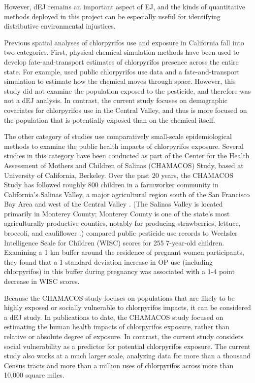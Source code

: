 \documentclass[ijerph,article,submit,oneauthor,pdftex]{Definitions/mdpi}
\begin{document}
However, dEJ remains an important aspect of EJ, and the kinds of quantitative methods deployed in this project can be especially useful for identifying distributive environmental injustices.

Previous spatial analyses of chlorpyrifos use and exposure in California fall into two categories. First, physical-chemical simulation methods have been used to develop fate-and-transport estimates of chlorpyrifos presence across the entire state. For example, \citet{LuoSpatiallyDistributedPesticide2010} used public chlorpyrifos use data and a fate-and-transport simulation to estimate how the chemical moves through space. However, this study did not examine the population exposed to the pesticide, and therefore was not a dEJ analysis. In contrast, the current study focuses on demographic covariates for chlorpyrifos use in the Central Valley, and thus is more focused on the population that is potentially exposed than on the chemical itself.

The other category of studies use comparatively small-scale epidemiological methods to examine the public health impacts of chlorpyrifos exposure. Several studies in this category have been conducted as part of the Center for the Health Assessment of Mothers and Children of Salinas (CHAMACOS) Study, based at University of California, Berkeley. Over the past 20 years, the CHAMACOS Study has followed roughly 800 children in a farmworker community in California's Salinas Valley, a major agricultural region south of the San Francisco Bay Area and west of the Central Valley \citep{CenterforEnvironmentalResearchandChildrensHealthCHAMACOSStudy}. (The Salinas Valley is located primarily in Monterey County; Monterey County is one of the state's most agriculturally productive counties, notably for producing strawberries, lettuce, broccoli, and cauliflower \citet[p 5]{CaliforniaDepartmentofFoodandAgricultureCaliforniaAgriculturalStatistics2017}.) \citet{GunierPrenatalResidentialProximity2017} compared public pesticide use records to Wechsler Intelligence Scale for Children (WISC) scores for 255 7-year-old children. Examining a 1 km buffer around the residence of pregnant women participants, they found that a 1 standard deviation increase in OP use (including chlorpyrifos) in this buffer during pregnancy was associated with a 1-4 point decrease in WISC scores. \citep[See also][]{LovasiChlorpyrifosExposureUrban2011}

Because the CHAMACOS study focuses on populations that are likely to be highly exposed or socially vulnerable to chlorpyrifos impacts, it can be considered a dEJ study. In publications to date, the CHAMACOS study focused on estimating the human health impacts of chlorpyrifos exposure, rather than relative or absolute degree of exposure. In contrast, the current study considers social vulnerability as a predictor for potential chlorpyrifos exposure. The current study also works at a much larger scale, analyzing data for more than a thousand Census tracts and more than a million uses of chlorpyrifos across more than 10,000 square miles.
\end{document}
